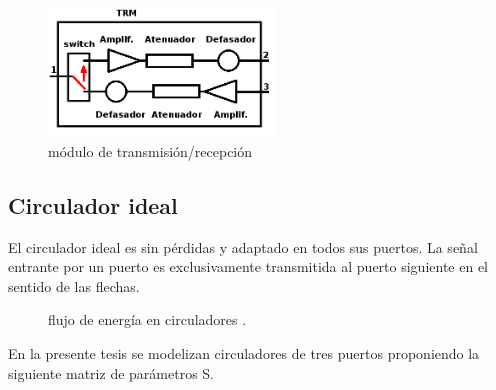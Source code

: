 \begin{figure}[H]
 \centering
 \includegraphics[width=6cm]{gfx/trm.png}
 \caption{módulo de transmisión/recepción}
 \label{fig:trm}
\end{figure}


\subsection{Circulador ideal}

El circulador ideal es sin pérdidas y adaptado en todos sus puertos. La señal entrante por un puerto es exclusivamente
transmitida al puerto siguiente en el sentido de las flechas.

\begin{figure}[H]
	\centering
	\caption{flujo de energía en circuladores \cite{Semiconductors1998}.}
	\label{fig:circulator}
\end{figure}

En la presente tesis se modelizan circuladores de tres puertos proponiendo la siguiente matriz de parámetros S.

